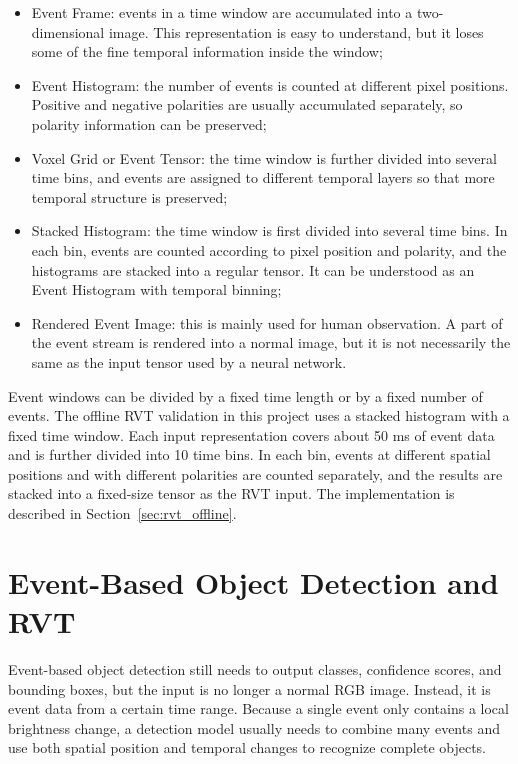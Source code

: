 \begin{itemize}
\item Event Frame: events in a time window are accumulated into a two-dimensional image. This representation is easy to understand, but it loses some of the fine temporal information inside the window;
\item Event Histogram: the number of events is counted at different pixel positions. Positive and negative polarities are usually accumulated separately, so polarity information can be preserved;
\item Voxel Grid or Event Tensor: the time window is further divided into several time bins, and events are assigned to different temporal layers so that more temporal structure is preserved;
\item Stacked Histogram: the time window is first divided into several time bins. In each bin, events are counted according to pixel position and polarity, and the histograms are stacked into a regular tensor. It can be understood as an Event Histogram with temporal binning;
\item Rendered Event Image: this is mainly used for human observation. A part of the event stream is rendered into a normal image, but it is not necessarily the same as the input tensor used by a neural network.
\end{itemize}

Event windows can be divided by a fixed time length or by a fixed number of events. The offline RVT validation in this project uses a stacked histogram with a fixed time window. Each input representation covers about 50 ms of event data and is further divided into 10 time bins. In each bin, events at different spatial positions and with different polarities are counted separately, and the results are stacked into a fixed-size tensor as the RVT input. The implementation is described in Section~\ref{sec:rvt_offline}.

\section{Event-Based Object Detection and RVT}

Event-based object detection still needs to output classes, confidence scores, and bounding boxes, but the input is no longer a normal RGB image. Instead, it is event data from a certain time range. Because a single event only contains a local brightness change, a detection model usually needs to combine many events and use both spatial position and temporal changes to recognize complete objects.

